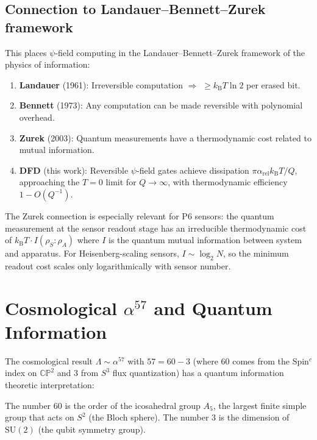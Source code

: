 \documentclass[11pt]{article}
\theoremstyle{definition}
\theoremstyle{remark}
\newcommand{\kB}{k_{\mathrm{B}}}
\begin{document}
\subsection{Connection to Landauer--Bennett--Zurek framework}

This places $\psi$-field computing in the Landauer--Bennett--Zurek
framework of the physics of information:

\begin{enumerate}
\item \textbf{Landauer} (1961): Irreversible computation $\Rightarrow$
$\geq \kB T\ln 2$ per erased bit.
\item \textbf{Bennett} (1973): Any computation can be made reversible
with polynomial overhead.
\item \textbf{Zurek} (2003): Quantum measurements have a thermodynamic
cost related to mutual information.
\item \textbf{DFD} (this work): Reversible $\psi$-field gates achieve
dissipation $\pi\alpha_{\mathrm{rel}}\kB T/Q$, approaching the $T = 0$
limit for $Q \to \infty$, with thermodynamic efficiency
$1 - O(Q^{-1})$.
\end{enumerate}

The Zurek connection is especially relevant for P6 sensors: the quantum
measurement at the sensor readout stage has an irreducible thermodynamic
cost of $\kB T \cdot I(\rho_S : \rho_A)$ where $I$ is the quantum
mutual information between system and apparatus. For Heisenberg-scaling
sensors, $I \sim \log_2 N$, so the minimum readout cost scales only
logarithmically with sensor number.

\section{Cosmological $\alpha^{57}$ and Quantum Information}
\label{sec:alpha57}

The cosmological result $\Lambda \sim \alpha^{57}$ with $57 = 60 - 3$
(where 60 comes from the Spin$^c$ index on $\mathbb{CP}^2$ and 3 from
$S^3$ flux quantization) has a quantum information theoretic
interpretation:

The number 60 is the order of the icosahedral group $A_5$, the largest
finite simple group that acts on $S^2$ (the Bloch sphere). The number 3
is the dimension of $\mathrm{SU}(2)$ (the qubit symmetry group).
\end{document}
